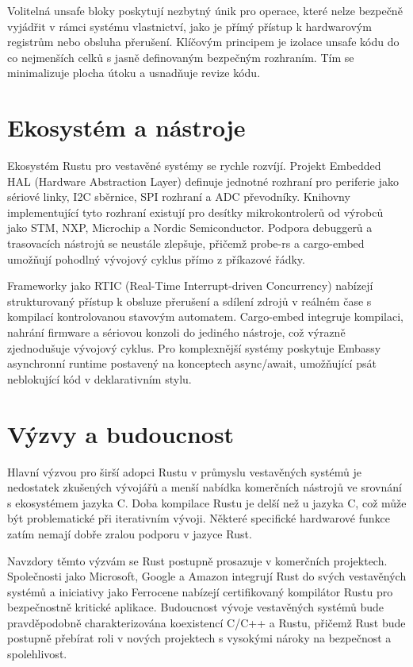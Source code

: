 \documentclass[
    language=czech,
    doctype=article,
]{../../omnilatex}
\begin{document}
Volitelná unsafe bloky poskytují nezbytný únik pro operace, které nelze bezpečně vyjádřit v rámci systému vlastnictví, jako je přímý přístup k hardwarovým registrům nebo obsluha přerušení. Klíčovým principem je izolace unsafe kódu do co nejmenších celků s jasně definovaným bezpečným rozhraním. Tím se minimalizuje plocha útoku a usnadňuje revize kódu.

\section{Ekosystém a nástroje}
Ekosystém Rustu pro vestavěné systémy se rychle rozvíjí. Projekt Embedded HAL (Hardware Abstraction Layer) definuje jednotné rozhraní pro periferie jako sériové linky, I2C sběrnice, SPI rozhraní a ADC převodníky. Knihovny implementující tyto rozhraní existují pro desítky mikrokontrolerů od výrobců jako STM, NXP, Microchip a Nordic Semiconductor. Podpora debuggerů a trasovacích nástrojů se neustále zlepšuje, přičemž probe-rs a cargo-embed umožňují pohodlný vývojový cyklus přímo z příkazové řádky.

Frameworky jako RTIC (Real-Time Interrupt-driven Concurrency) nabízejí strukturovaný přístup k obsluze přerušení a sdílení zdrojů v reálném čase s kompilací kontrolovanou stavovým automatem. Cargo-embed integruje kompilaci, nahrání firmware a sériovou konzoli do jediného nástroje, což výrazně zjednodušuje vývojový cyklus. Pro komplexnější systémy poskytuje Embassy asynchronní runtime postavený na konceptech async/await, umožňující psát neblokující kód v deklarativním stylu.

\section{Výzvy a budoucnost}
Hlavní výzvou pro širší adopci Rustu v průmyslu vestavěných systémů je nedostatek zkušených vývojářů a menší nabídka komerčních nástrojů ve srovnání s ekosystémem jazyka C. Doba kompilace Rustu je delší než u jazyka C, což může být problematické při iterativním vývoji. Některé specifické hardwarové funkce zatím nemají dobře zralou podporu v jazyce Rust.

Navzdory těmto výzvám se Rust postupně prosazuje v komerčních projektech. Společnosti jako Microsoft, Google a Amazon integrují Rust do svých vestavěných systémů a iniciativy jako Ferrocene nabízejí certifikovaný kompilátor Rustu pro bezpečnostně kritické aplikace. Budoucnost vývoje vestavěných systémů bude pravděpodobně charakterizována koexistencí C/C++ a Rustu, přičemž Rust bude postupně přebírat roli v nových projektech s vysokými nároky na bezpečnost a spolehlivost.
\end{document}
